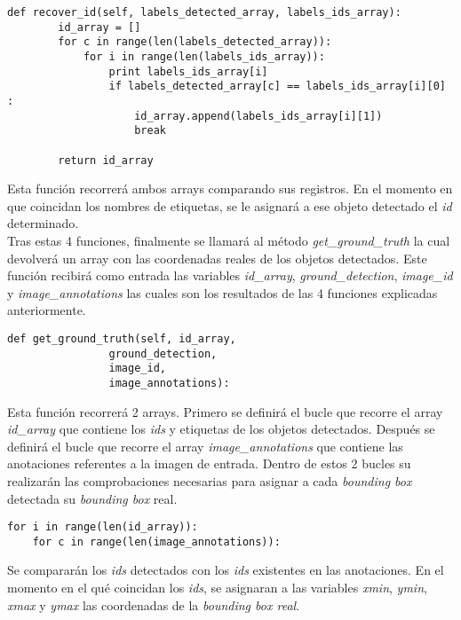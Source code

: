 \documentclass[a4paper, 12pt, oneside]{book}
\begin{document}
\begin{lstlisting}[frame=single]
    def recover_id(self, labels_detected_array, labels_ids_array):
        id_array = []
        for c in range(len(labels_detected_array)):
            for i in range(len(labels_ids_array)):
                print labels_ids_array[i]
                if labels_detected_array[c] == labels_ids_array[i][0] :
                    id_array.append(labels_ids_array[i][1])
                    break

        return id_array
\end{lstlisting}

Esta función recorrerá ambos arrays comparando sus registros. En el momento en que coincidan los nombres de etiquetas, se le asignará a ese objeto detectado el \textit{id} determinado.\\

Tras estas 4 funciones, finalmente se llamará al método \textit{get\_ground\_truth} la cual devolverá un array con las coordenadas reales de los objetos detectados. Este función recibirá como entrada las variables \textit{id\_array}, \textit{ground\_detection}, \textit{image\_id} y \textit{image\_annotations} las cuales son los resultados de las 4 funciones explicadas anteriormente.\\

\begin{lstlisting}[frame=single]
def get_ground_truth(self, id_array,
				ground_detection,
				image_id,
				image_annotations):
\end{lstlisting}

Esta función recorrerá 2 arrays. Primero se definirá el bucle que recorre el array \textit{id\_array} que contiene los \textit{ids} y etiquetas de los objetos detectados. Después se definirá el bucle que recorre el array \textit{image\_annotations} que contiene las anotaciones referentes a la imagen de entrada. Dentro de estos 2 bucles su realizarán las comprobaciones necesarias para asignar a cada \textit{bounding box} detectada su \textit{bounding box} real.\\

\begin{lstlisting}[frame=single]
for i in range(len(id_array)):
	for c in range(len(image_annotations)):
\end{lstlisting}

Se compararán los \textit{ids} detectados con los \textit{ids} existentes en las anotaciones. En el momento en el qué coincidan los \textit{ids}, se asignaran a las variables \textit{xmin}, \textit{ymin}, \textit{xmax} y \textit{ymax} las coordenadas de la \textit{bounding box real}.\\
\end{document}
